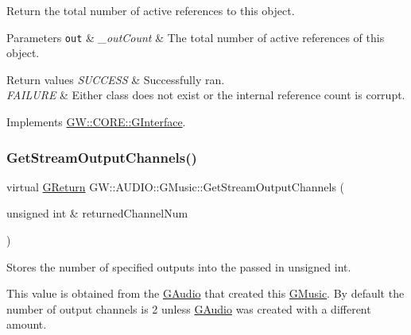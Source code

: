 Return the total number of active references to this object. 


\begin{DoxyParams}[1]{Parameters}
\mbox{\tt out}  & {\em \+\_\+out\+Count} & The total number of active references of this object.\\
\hline
\end{DoxyParams}

\begin{DoxyRetVals}{Return values}
{\em S\+U\+C\+C\+E\+SS} & Successfully ran. \\
\hline
{\em F\+A\+I\+L\+U\+RE} & Either class does not exist or the internal reference count is corrupt. \\
\hline
\end{DoxyRetVals}


Implements \mbox{\hyperlink{classGW_1_1CORE_1_1GInterface_aacf5834174a7024f8a3c361122ee9e76}{G\+W\+::\+C\+O\+R\+E\+::\+G\+Interface}}.

\mbox{\label{classGW_1_1AUDIO_1_1GMusic_a750dcb654e813c322d7617e1a5ebdf93}} 
\subsubsection{\texorpdfstring{Get\+Stream\+Output\+Channels()}{GetStreamOutputChannels()}}
{\footnotesize\ttfamily virtual \mbox{\hyperlink{namespaceGW_a67a839e3df7ea8a5c5686613a7a3de21}{G\+Return}} G\+W\+::\+A\+U\+D\+I\+O\+::\+G\+Music\+::\+Get\+Stream\+Output\+Channels (\begin{DoxyParamCaption}\item[{unsigned int \&}]{returned\+Channel\+Num }\end{DoxyParamCaption})\hspace{0.3cm}{\ttfamily [pure virtual]}}



Stores the number of specified outputs into the passed in unsigned int. 

This value is obtained from the \mbox{\hyperlink{classGW_1_1AUDIO_1_1GAudio}{G\+Audio}} that created this \mbox{\hyperlink{classGW_1_1AUDIO_1_1GMusic}{G\+Music}}. By default the number of output channels is 2 unless \mbox{\hyperlink{classGW_1_1AUDIO_1_1GAudio}{G\+Audio}} was created with a different amount.


